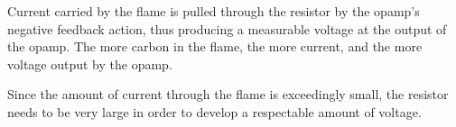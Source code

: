 





Current carried by the flame is pulled through the resistor by the opamp's negative feedback action, thus producing a measurable voltage at the output of the opamp.  The more carbon in the flame, the more current, and the more voltage output by the opamp.  

\vskip 10pt

Since the amount of current through the flame is exceedingly small, the resistor needs to be very large in order to develop a respectable amount of voltage.











